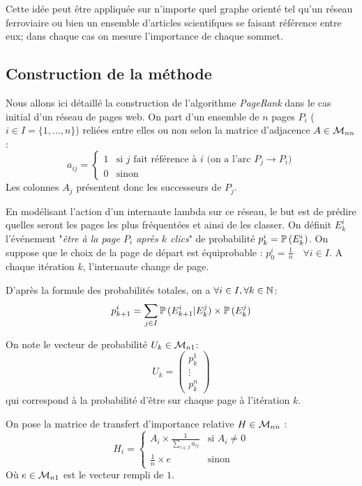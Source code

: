 		Cette idée peut être appliquée sur n'importe quel graphe orienté tel qu'un réseau ferroviaire ou bien un ensemble d'articles scientifques se faisant référence entre eux; dans chaque cas on mesure l'importance de chaque sommet.

	\subsection{Construction de la méthode}
		    
		Nous allons ici détaillé la construction de l'algorithme \emph{PageRank} dans le cas initial d'un réseau de pages web.
		On part d'un ensemble de $n$ pages $P_i$ ($i \in I = \{1,...,n\}$) reliées entre elles ou non selon la matrice d'adjacence $A \in \mathcal{M}_{nn}$ :
		$$
			a_{ij} = \begin{cases}
				1	& \text{si $j$ fait référence à $i$ (on a l'arc $P_j \to P_i$)}	\\
				0	& \text{sinon}			
			\end{cases}
		$$
		Les colonnes $A_j$ présentent donc les successeurs de $P_j$. 


		En modélisant l'action d'un internaute lambda sur ce réseau, le but est de prédire quelles seront les pages les plus fréquentées et ainsi de les classer.
		On définit $E_k^i$ l'événement "\emph{être à la page $P_i$ après $k$ clics}" de probabilité $p_k^i = \mathbb{P}\,(E_k^i)$. On suppose que le choix de la page de départ est équiprobable : $p_0^i = \frac{1}{n} \quad \forall i \in I$.
		A chaque itération $k$, l'internaute change de page.

		D'après la formule des probabilités totales, on a $\forall i \in I, \forall k \in \mathbb{N}$:
		$$
			p_{k+1}^i = \sum_{j\in I} \mathbb{P}\,(E_{k+1}^i|E_k^j) \times \mathbb{P}\,(E_k^j)
		$$

		On note le vecteur de probabilité $U_k\in\mathcal{M}_{n1}$:
		\begin{equation}
			\label{eq-4-u}
			U_k = \begin{pmatrix}
				p_k^1	\\			
				\vdots	\\			
				p_k^n		
			\end{pmatrix}		
		\end{equation}
		qui correspond à la probabilité d'être sur chaque page à l'itération $k$.

		On pose la matrice de transfert d'importance relative $H\in\mathcal{M}_{nn}$ :
		\begin{equation}
			\label{eq-4-h}
			H_i = \begin{cases}
				A_i \times \frac{1}{\displaystyle \sum_{i\in I} a_{ij}}		& \text{si } A_i \neq 0	\\
				\frac{1}{n} \times e										& \text{sinon}
			\end{cases}
		\end{equation}
		Où $e \in \mathcal{M}_{n1}$ est le vecteur rempli de $1$.

